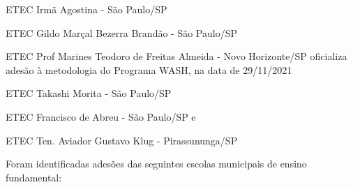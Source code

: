 \documentclass[
12pt,		%
openright,	%
twoside,  %
a4paper,			%
chapter=TITLE,		%
english,			%
french,				%
spanish,			%
brazil				%
]{USPSC-classe/USPSC}
\begin{document}
\begin{alineas}
\item ETEC Irm\~a Agostina - S\~ao Paulo/SP
\item ETEC Gildo Mar\c{c}al Bezerra Brand\~ao - S\~ao Paulo/SP
\item ETEC Prof Marines Teodoro de Freitas Almeida - Novo Horizonte/SP oficializa ades\~ao \`a metodologia do Programa WASH, na data de 29/11/2021
\item ETEC Takashi Morita - S\~ao Paulo/SP
\item ETEC Francisco de Abreu - S\~ao Paulo/SP e
\item ETEC Ten. Aviador Gustavo Klug - Pirassununga/SP
\end{alineas}

Foram identificadas ades\~oes das seguintes escolas municipais de ensino fundamental:
\end{document}
